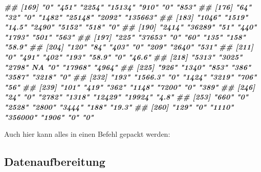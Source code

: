 \documentclass[
  ngerman,
]{article}
\newenvironment{Shaded}{\begin{snugshade}}{\end{snugshade}}
\newcommand{\DocumentationTok}[1]{\textcolor[rgb]{0.56,0.35,0.01}{\textbf{\textit{#1}}}}
\newcommand{\FunctionTok}[1]{\textcolor[rgb]{0.00,0.00,0.00}{#1}}
\newcommand{\NormalTok}[1]{#1}
\newcommand{\OtherTok}[1]{\textcolor[rgb]{0.56,0.35,0.01}{#1}}
\newcommand{\SpecialCharTok}[1]{\textcolor[rgb]{0.00,0.00,0.00}{#1}}
\newcommand{\StringTok}[1]{\textcolor[rgb]{0.31,0.60,0.02}{#1}}
\begin{document}
\begin{Shaded}
\begin{Highlighting}[]
\DocumentationTok{\#\# [169] "0"       "451"     "2254"    "15134"   "910"     "0"       "853"    }
\DocumentationTok{\#\# [176] "64"      "32"      "0"       "1482"    "25148"   "2092"    "135663" }
\DocumentationTok{\#\# [183] "1046"    "1519"    "14.5"    "2490"    "5152"    "518"     "0"      }
\DocumentationTok{\#\# [190] "2414"    "36289"   "51"      "440"     "1793"    "501"     "563"    }
\DocumentationTok{\#\# [197] "225"     "37653"   "0"       "60"      "135"     "158"     "58.9"   }
\DocumentationTok{\#\# [204] "120"     "84"      "403"     "0"       "209"     "2640"    "531"    }
\DocumentationTok{\#\# [211] "0"       "491"     "402"     "193"     "58.9"    "0"       "46.6"   }
\DocumentationTok{\#\# [218] "5313"    "3025"    "2798"    NA        "0"       "17968"   "4964"   }
\DocumentationTok{\#\# [225] "926"     "1340"    "853"     "386"     "3587"    "3218"    "0"      }
\DocumentationTok{\#\# [232] "193"     "1566.3"  "0"       "1424"    "3219"    "706"     "56"     }
\DocumentationTok{\#\# [239] "101"     "419"     "362"     "1148"    "7200"    "0"       "389"    }
\DocumentationTok{\#\# [246] "24"      "0"       "2782"    "1318"    "12429"   "19924"   "4.8"    }
\DocumentationTok{\#\# [253] "660"     "0"       "2528"    "2800"    "3444"    "188"     "19.3"   }
\DocumentationTok{\#\# [260] "129"     "0"       "1110"    "356000"  "1906"    "0"       "0"}
\end{Highlighting}
\end{Shaded}

Auch hier kann alles in einen Befehl gepackt werden:

\begin{Shaded}
\end{Shaded}

\hypertarget{datenaufbereitung}{%
\subsection{Datenaufbereitung}\label{datenaufbereitung}}
\end{document}
